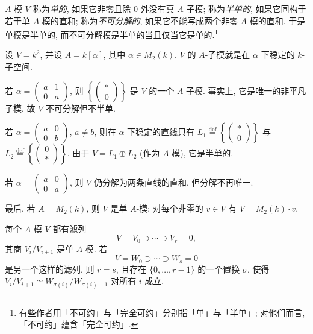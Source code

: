 $A$-模 $V$ 称为\emph{单的}, 如果它非零且除 $0$ 外没有真 $A$-子模; 称为\emph{半单的}, 如果它同构于若干单 $A$-模的直和; 称为\emph{不可分解的}, 如果它不能写成两个非零 $A$-模的直和. 于是单模是半单的, 而不可分解模是半单的当且仅当它是单的.\footnote{有些作者用「不可约」与「完全可约」分别指「单」与「半单」; 对他们而言, 「不可约」蕴含「完全可约」.}

\begin{example}\label{ex:iv.1.1}
设 $V=k^2$, 并设 $A=k[\alpha]$, 其中 $\alpha\in M_2(k)$. $V$ 的 $A$-子模就是在 $\alpha$ 下稳定的 $k$-子空间.

若 $\alpha=\begin{pmatrix}a&1\\0&a\end{pmatrix}$, 则 $\left\{\begin{pmatrix}*\\0\end{pmatrix}\right\}$ 是 $V$ 的一个 $A$-子模. 事实上, 它是唯一的非平凡子模, 故 $V$ 不可分解但不半单.

若 $\alpha=\begin{pmatrix}a&0\\0&b\end{pmatrix}$, $a\neq b$, 则在 $\alpha$ 下稳定的直线只有 $L_1\stackrel{\mathrm{def}}{=}\left\{\begin{pmatrix}*\\0\end{pmatrix}\right\}$ 与 $L_2\stackrel{\mathrm{def}}{=}\left\{\begin{pmatrix}0\\*\end{pmatrix}\right\}$. 由于 $V=L_1\oplus L_2$ (作为 $A$-模), 它是半单的.

若 $\alpha=\begin{pmatrix}a&0\\0&a\end{pmatrix}$, 则 $V$ 仍分解为两条直线的直和, 但分解不再唯一.

最后, 若 $A=M_2(k)$, 则 $V$ 是单 $A$-模: 对每个非零的 $v\in V$ 有 $V=M_2(k)\cdot v$.
\end{example}

\begin{theorem}\label{thm:iv.1.2}
每个 $A$-模 $V$ 都有滤列
\[
V=V_0\supset\cdots\supset V_r=0,
\]
其商 $V_i/V_{i+1}$ 是单 $A$-模. 若
\[
V=W_0\supset\cdots\supset W_s=0
\]
是另一个这样的滤列, 则 $r=s$, 且存在 $\{0,\ldots,r-1\}$ 的一个置换 $\sigma$, 使得 $V_i/V_{i+1}\simeq W_{\sigma(i)}/W_{\sigma(i)+1}$ 对所有 $i$ 成立.
\end{theorem}

